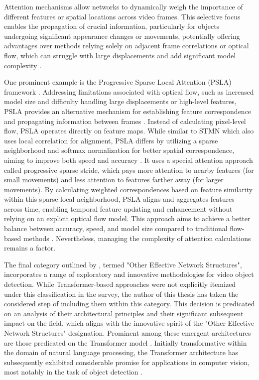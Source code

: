 Attention mechanisms allow networks to dynamically weigh the importance of different features or spatial locations across video frames. This selective focus enables the propagation of crucial information, particularly for objects undergoing significant appearance changes or movements, potentially offering advantages over methods relying solely on adjacent frame correlations or optical flow, which can struggle with large displacements and add significant model complexity \cite{jiaoNewGenerationDeep2022, guoProgressiveSparseLocal2019}.

One prominent example is the Progressive Sparse Local Attention (PSLA) framework \cite{guoProgressiveSparseLocal2019}. Addressing limitations associated with optical flow, such as increased model size and difficulty handling large displacements or high-level features, PSLA provides an alternative mechanism for establishing feature correspondence and propagating information between frames \cite{guoProgressiveSparseLocal2019}. Instead of calculating pixel-level flow, PSLA operates directly on feature maps. While similar to STMN \cite{xiaoVideoObjectDetection2018} which also uses local correlation for alignment, PSLA differs by utilizing a sparse neighborhood and softmax normalization for better spatial correspondence, aiming to improve both speed and accuracy \cite{guoProgressiveSparseLocal2019}. It uses a special attention approach called progressive sparse stride, which pays more attention to nearby features (for small movements) and less attention to features farther away (for larger movements). By calculating weighted correspondences based on feature similarity within this sparse local neighborhood, PSLA aligns and aggregates features across time, enabling temporal feature updating and enhancement without relying on an explicit optical flow model. This approach aims to achieve a better balance between accuracy, speed, and model size compared to traditional flow-based methods \cite{guoProgressiveSparseLocal2019}. Nevertheless, managing the complexity of attention calculations remains a factor.

The final category outlined by \cite{jiaoNewGenerationDeep2022}, termed "Other Effective Network Structures", incorporates a range of exploratory and innovative methodologies for video object detection. While Transformer-based approaches were not explicitly itemized under this classification in the \cite{jiaoNewGenerationDeep2022} survey, the author of this thesis has taken the considered step of including them within this category. This decision is predicated on an analysis of their architectural principles and their significant subsequent impact on the field, which aligns with the innovative spirit of the "Other Effective Network Structures" designation. Prominent among these emergent architectures are those predicated on the Transformer model \cite{vaswaniAttentionAllYou2023}. Initially transformative within the domain of natural language processing, the Transformer architecture has subsequently exhibited considerable promise for applications in computer vision, most notably in the task of object detection \cite{carionEndtoEndObjectDetection2020}.

